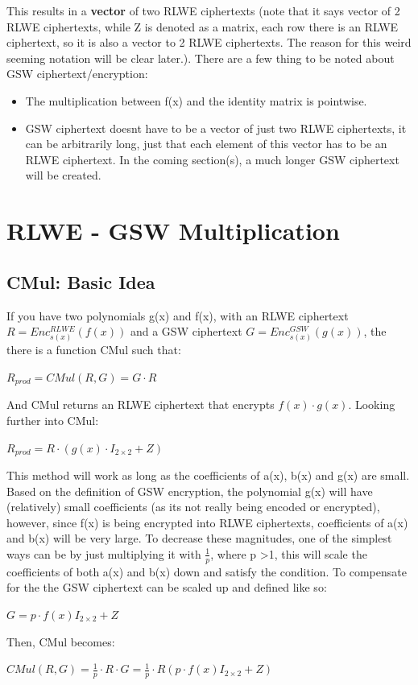 \documentclass{report}
\begin{document}
	This results in a \textbf{vector} of two RLWE ciphertexts (note that it says vector of 2 RLWE ciphertexts, while Z is denoted as a matrix, each row there is an RLWE ciphertext, so it is also a vector to 2 RLWE ciphertexts. The reason for this weird seeming notation will be clear later.). There are a few thing to be noted about GSW ciphertext/encryption:
	\begin{itemize}
		\item The multiplication between f(x) and the identity matrix is pointwise.
		\item GSW ciphertext doesnt have to be a vector of just two RLWE ciphertexts, it can be arbitrarily long, just that each element of this vector has to be an RLWE ciphertext. In the coming section(s), a much longer GSW ciphertext will be created.
	\end{itemize}
	
	\section{RLWE - GSW Multiplication}
	\subsection{CMul: Basic Idea}
	If you have two polynomials g(x) and f(x), with an RLWE ciphertext $R = Enc^{RLWE}_{s(x)} (f(x))$ and a GSW ciphertext $G = Enc^{GSW}_{s(x)}(g(x))$, the there is a function CMul such that:
	\begin{center}
		$R_{prod} = CMul(R, G) = G \cdot R$
	\end{center}
	And CMul returns an RLWE ciphertext that encrypts $f(x) \cdot g(x)$.  Looking further into CMul:
	\begin{center}
		$R_{prod} = R \cdot ( g(x) \cdot I_{2 \times 2} + Z)$
	\end{center}
	This method will work as long as the coefficients of a(x), b(x) and g(x) are small. Based on the definition of GSW encryption, the polynomial g(x) will have (relatively) small coefficients (as its not really being encoded or encrypted), however, since f(x) is being encrypted into RLWE ciphertexts, coefficients of a(x) and b(x) will be very large. To decrease these magnitudes, one of the simplest ways can be by just multiplying it with $\frac{1}{p}$, where p >1, this will scale the coefficients of both a(x) and b(x) down and satisfy the condition. To compensate for the the GSW ciphertext can be scaled up and defined like so:
	\begin{center}
		$G = p \cdot f(x) I_{2 \times 2} + Z$
	\end{center}
	Then, CMul becomes:
	\begin{center}
		$CMul(R, G) = \frac{1}{p} \cdot R \cdot G = \frac{1}{p} \cdot R ( p \cdot f(x) I_{2 \times 2} + Z )$
	\end{center}
	
\end{document}
